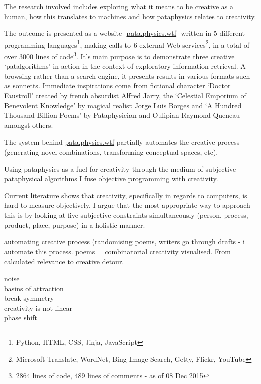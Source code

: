 The research involved includes exploring what it means to be creative as a human, how this translates to machines and how pataphysics relates to creativity.

The outcome is presented as a website -\url{pata.physics.wtf}- written in 5 different programming languages\footnote{Python, HTML, CSS, Jinja, JavaScript}, making calls to 6 external Web services\footnote{Microsoft Translate, WordNet, Bing Image Search, Getty, Flickr, YouTube}, in a total of over 3000 lines of code\footnote{2864 lines of code, 489 lines of comments - as of 08 Dec 2015}. It's main purpose is to demonstrate three creative `patalgorithms' in action in the context of exploratory information retrieval. A browsing rather than a search engine, it presents results in various formats such as sonnetts. Immediate inspirations come from fictional character `Doctor Faustroll' created by french absurdist Alfred Jarry, the `Celestial Emporium of Benevolent Knowledge' by magical realist Jorge Luis Borges and `A Hundred Thousand Billion Poems' by Pataphysician and Oulipian Raymond Queneau amongst others.

The system behind \url{pata.physics.wtf} partially automates the creative process (generating novel combinations, transforming conceptual spaces, etc).

Using pataphysics as a fuel for creativity through the medium of subjective pataphysical algorithms I fuse objective programming with creativity.


Current literature shows that creativity, specifically in regards to computers, is hard to measure objectively. I argue that the most appropriate way to approach this is by looking at five subjective constraints simultaneously (person, process, product, place, purpose) in a holistic manner.

\begin{fcom}
  automating creative process (randomising poems, writers go through drafts - i automate this process. poems = combinatorial creativity visualised.
  From calculated relevance to creative detour.
\end{fcom}

\begin{fcom}
  noise\\
  basins of attraction\\
  break symmetry\\
  creativity is not linear\\
  phase shift\\
  \autocite{Everitt2011}
\end{fcom}

